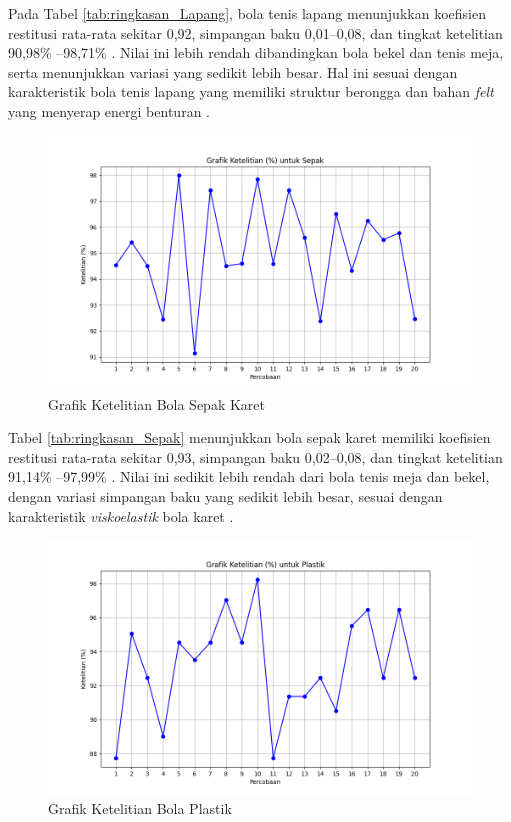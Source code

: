 Pada Tabel \ref{tab:ringkasan_Lapang}, bola tenis lapang menunjukkan koefisien restitusi rata-rata sekitar 0,92, simpangan baku 0,01--0,08, dan tingkat ketelitian 90,98\% --98,71\% . Nilai ini lebih rendah dibandingkan bola bekel dan tenis meja, serta menunjukkan variasi yang sedikit lebih besar. Hal ini sesuai dengan karakteristik bola tenis lapang yang memiliki struktur berongga dan bahan \textit{felt} yang menyerap energi benturan \citep{penner2002physics, cross2002coefficient}.

\begin{figure}[!htbp]
    \centering
    \includegraphics[width=0.5\linewidth]{output_tex/Grafik_ketelitian_Sepak.png}
    \caption{Grafik Ketelitian Bola Sepak Karet}
    \label{fig:grafik-bola-karet}
\end{figure}
\newpage


Tabel \ref{tab:ringkasan_Sepak} menunjukkan bola sepak karet memiliki koefisien restitusi rata-rata sekitar 0,93, simpangan baku 0,02--0,08, dan tingkat ketelitian 91,14\% --97,99\% . Nilai ini sedikit lebih rendah dari bola tenis meja dan bekel, dengan variasi simpangan baku yang sedikit lebih besar, sesuai dengan karakteristik \textit{viskoelastik} bola karet \citep{brancazio1981physics}.

\begin{figure}[!htbp]
    \centering
    \includegraphics[width=0.5\linewidth]{output_tex/Grafik_ketelitian_Plastik.png}
    \caption{Grafik Ketelitian Bola Plastik}
    \label{fig:grafik-bola-plastik}
\end{figure}
\newpage


